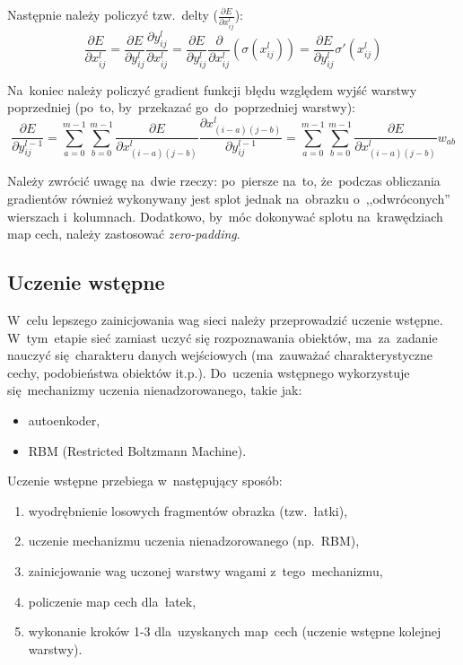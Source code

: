 Następnie należy policzyć tzw.~delty ($\frac{\partial E}{\partial x_{ij}^l}$):
$$\frac{\partial E}{\partial x_{ij}^l} = \frac{\partial E}{\partial y_{ij}^l}\frac{\partial y_{ij}^l}{\partial
x_{ij}^l} =
\frac{\partial E}{\partial y_{ij}^l}\frac{\partial}{\partial x_{ij}^l}(\sigma(x_{ij}^l))
= \frac{\partial E}{\partial y_{ij}^l}\sigma'(x_{ij}^l)
$$

Na~koniec należy policzyć gradient funkcji błędu względem wyjść warstwy poprzedniej (po~to, by~przekazać
go~do~poprzedniej warstwy):
$$ \frac{\partial E}{\partial y_{ij}^{l-1}} =
\sum\limits_{a=0}^{m-1}\sum\limits_{b=0}^{m-1} \frac{\partial E}{\partial x^l_{(i-a)(j-b)}}
\frac{\partial x^l_{(i-a)(j-b)}}{\partial y_{ij}^{l-1}} =
\sum\limits_{a=0}^{m-1}\sum\limits_{b=0}^{m-1} \frac{\partial E}{\partial x^l_{(i-a)(j-b)}}w_{ab}$$

Należy zwrócić uwagę na~dwie rzeczy: po~piersze na~to, że~podczas obliczania gradientów również wykonywany
jest splot jednak na~obrazku o~,,odwróconych'' wierszach i~kolumnach. Dodatkowo, by~móc dokonywać splotu
na~krawędziach map cech, należy zastosować \textit{zero-padding}.

\subsection{Uczenie wstępne}
W~celu lepszego zainicjowania wag sieci należy przeprowadzić uczenie wstępne. W~tym~etapie sieć zamiast uczyć
się rozpoznawania obiektów, ma~za~zadanie nauczyć się~charakteru danych wejściowych (ma~zauważać
charakterystyczne cechy, podobieństwa obiektów it.p.). Do~uczenia wstępnego wykorzystuje się~mechanizmy
uczenia nienadzorowanego, takie jak:
\begin{itemize}
  \item autoenkoder,
  \item RBM (Restricted Boltzmann Machine).
\end{itemize}

Uczenie wstępne przebiega w~następujący sposób:
\begin{enumerate}
  \item wyodrębnienie losowych fragmentów obrazka (tzw.~łatki),
  \item uczenie mechanizmu uczenia nienadzorowanego (np.~RBM),
  \item zainicjowanie wag uczonej warstwy wagami z~tego~mechanizmu,
  \item policzenie map cech dla~łatek,
  \item wykonanie kroków 1-3 dla~uzyskanych map~cech (uczenie wstępne kolejnej warstwy).
\end{enumerate}
